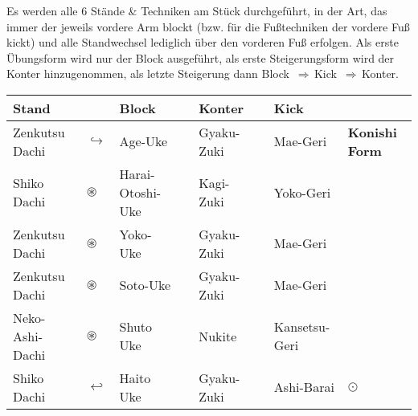 \begin{tcolorbox}[width=\textwidth,height=\textheight,right=12pt,left=12pt,colframe=GKD,colback=white,fonttitle=\bfseries,coltitle=white,title=Allgemeines:\indent B\={o}gy\={o} R\={o}k\={u} Kyod\={o} aus dem Japan Karate-D\={o} Jinen-Kai]
	\null\vfill\null
	\begin{center}
		\parbox{\textwidth-2\tabcolsep}{Es werden alle 6 Stände \& Techniken am Stück durchgeführt, in der Art, das immer der jeweils vordere Arm blockt (bzw. für die Fußtechniken der vordere Fuß kickt) und alle Standwechsel lediglich über den vorderen Fuß erfolgen. Als erste Übungsform wird nur der Block ausgeführt, als erste Steigerungsform wird der Konter hinzugenommen, als letzte Steigerung dann \mbox{Block \(\Rightarrow\)\,Kick \(\Rightarrow\)\,Konter.}}
	\end{center}
	\begin{tabularx}{\textwidth}{lllXlXll}
		Stand	&&Block	&&Konter	&&Kick&\\
		\midrule
		Zenkutsu Dachi 	& \(\hookrightarrow\) & Age-Uke	&&Gyaku-Zuki	&&Mae-Geri&\textbf{Konishi Form}\\
		Shiko Dachi 	& \(\circledast\) & Harai-Otoshi-Uke	&&Kagi-Zuki&&Yoko-Geri&\\
		Zenkutsu Dachi	& \(\circledast\) & Yoko-Uke	&&Gyaku-Zuki&&Mae-Geri&\\
		Zenkutsu Dachi	& \(\circledast\) & Soto-Uke	&&Gyaku-Zuki&&Mae-Geri&\\
		Neko-Ashi-Dachi	& \(\circledast\) & Shuto Uke	&&Nukite&&Kansetsu-Geri&\\
		Shiko Dachi	& \(\hookleftarrow\) & Haito Uke	&&Gyaku-Zuki&&Ashi-Barai& \(\odot\)\\
		\midrule
	\end{tabularx}\\\null\vfill\null
\end{tcolorbox}